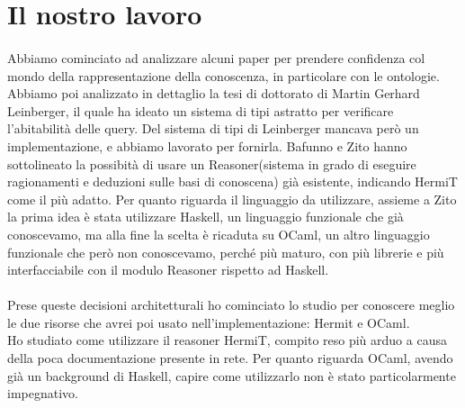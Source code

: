 \section{Il nostro lavoro}
\paragraph{} Abbiamo cominciato ad analizzare alcuni paper per prendere confidenza col mondo della rappresentazione della conoscenza, in particolare con le ontologie. Abbiamo poi analizzato in dettaglio la tesi di dottorato di Martin Gerhard Leinberger, il quale ha ideato un sistema di tipi astratto per verificare l'abitabilità delle query. Del sistema di tipi di Leinberger mancava però un implementazione, e abbiamo lavorato per fornirla. Bafunno e Zito hanno sottolineato la possibità di usare un Reasoner(sistema in grado di eseguire ragionamenti e deduzioni sulle basi di conoscena) già esistente, indicando HermiT come il più adatto. Per quanto riguarda il linguaggio da utilizzare, assieme a Zito la prima idea è stata utilizzare Haskell, un linguaggio funzionale che già conoscevamo, ma alla fine la scelta è ricaduta su OCaml, un altro linguaggio funzionale che però non conoscevamo, perché più maturo, con più librerie e più interfacciabile con il modulo Reasoner rispetto ad Haskell.

\paragraph{} Prese queste decisioni architetturali ho cominciato lo studio per conoscere meglio le due risorse che avrei poi usato nell'implementazione: Hermit e OCaml.\\
Ho studiato come utilizzare il reasoner HermiT, compito reso più arduo a causa della poca documentazione presente in rete. Per quanto riguarda OCaml, avendo già un background di Haskell, capire come utilizzarlo non è stato particolarmente impegnativo. \\

